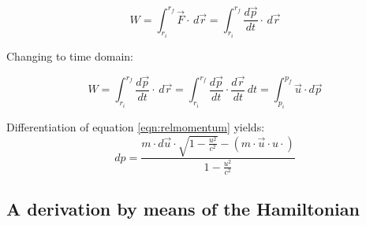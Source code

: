 \documentclass[letterpaper, 12pt]{article}
\begin{document}
\begin{equation}
		W = \int_{r_i}^{r_f} \vec{F} \cdot \,d\vec{r} = \int_{r_i}^{r_f} \frac{d\vec{p}}{dt} \cdot \,d\vec{r} 
\end{equation}

Changing to time domain:

\begin{equation}
	W = \int_{r_i}^{r_f} \frac{d\vec{p}}{dt} \cdot \,d\vec{r}  = \int_{r_i}^{r_f} \frac{d\vec{p}}{dt} \cdot \frac{d\vec{r}}{dt} \,dt   = \int_{p_i}^{p_f} \vec{u} \cdot  d\vec{p}
\end{equation}

Differentiation of equation \ref{eqn:relmomentum} yields:
\begin{equation}
	dp = \frac{m \cdot d\vec{u}\cdot \sqrt{1-\frac{u^2}{c^2}}- (m \cdot \vec{u} \cdot u \cdot  )}{1-\frac{u^2}{c^2}}
\end{equation}

\subsection{A derivation by means of the Hamiltonian}
\end{document}
